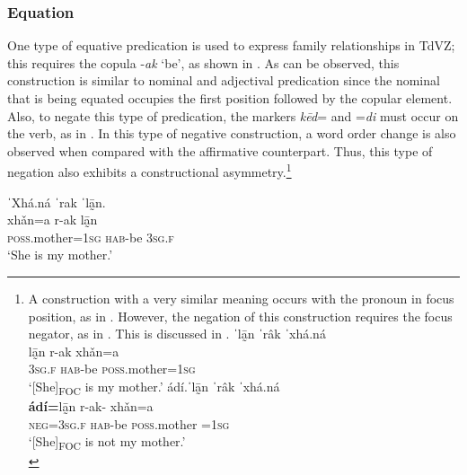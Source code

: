 \documentclass[output=paper,colorlinks=true, citecolor=brown]{langscibook}
\begin{document}
\subsubsection{Equation}\label{sec:zap:2.3.4}

One type of equative predication is used to express family relationships in TdVZ; this requires the copula -\textit{ak} ‘be’, as shown in .
As can be observed, this construction is similar to nominal and adjectival predication since the nominal that is being equated occupies the first position followed by the copular element. Also, to negate this type of predication, the markers \textit{kēd}= and =\textit{di} must occur on the verb, as in . In this type of negative construction, a word order change is also observed when compared with the affirmative counterpart. Thus, this type of negation also exhibits a constructional asymmetry.\footnote{A construction with a very similar meaning occurs with the pronoun in focus position, as in . However, the negation of this construction requires the focus negator, as in . This is discussed in .
    \ea\label{ex:zap:fn}
        \ea\label{ex:zap:fn:iia}
            \glll ˈlā̰n ˈrâk ˈxhá.ná \\
                lā̰n r-ak xhǎn=a  \\
                \textsc{3sg.f} \textsc{hab}{}-be \textsc{poss}.mother=\textsc{1sg} \\
            \glt ‘[She]\textsubscript{FOC} is my mother.’ 
        \ex\label{ex:zap:fn:iib}    
            \glll ádí.ˈlā̰n ˈrâk ˈxhá.ná \\
              \textbf{ádí=}lā̰n r-ak- xhǎn=a  \\        
              \textsc{neg}=\textsc{3sg.f} \textsc{hab}{}-be \textsc{poss}.mother =\textsc{1sg} \\ 
             \glt ‘[She]\textsubscript{FOC} is not my mother.’\\
        \z
    \z }%

\ea\label{ex:zap:45} 
    \glll  ˈXhá.ná ˈrak ˈlā̰n.\\
            xhǎn=a r-ak lā̰n\\ 
           \textsc{poss}.mother=\textsc{1sg} \textsc{hab}{}-be \textsc{3sg.f}\\
    \glt  ‘She is my mother.’
\z
\end{document}
